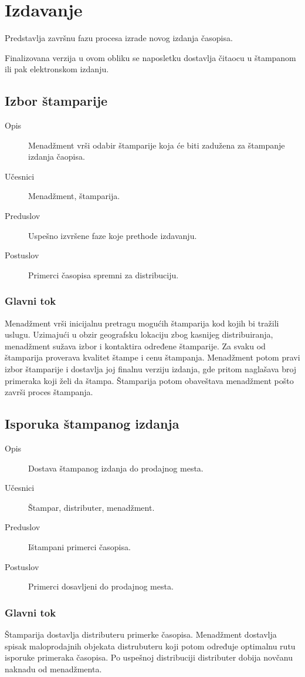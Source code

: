\section{Izdavanje}
Predstavlja završnu fazu procesa izrade novog izdanja časopisa.

Finalizovana verzija u ovom obliku se naposletku dostavlja čitaocu u štampanom ili pak elektronskom izdanju.

\subsection{Izbor štamparije}
\begin{description}
\item [Opis] Menadžment vrši odabir štamparije koja će biti zadužena za štampanje izdanja čaopisa.
\item [Učesnici] Menadžment, štamparija.
\item [Preduslov] Uspešno izvršene faze koje prethode izdavanju.
\item [Postuslov] Primerci časopisa spremni za distribuciju.
\end{description}
\subsubsection{Glavni tok}
Menadžment vrši inicijalnu pretragu mogućih štamparija kod kojih bi tražili uslugu. Uzimajući u obzir geografsku lokaciju zbog kasnijeg distribuiranja, menadžment sužava izbor i kontaktira određene štamparije.
Za svaku od štamparija proverava kvalitet štampe i cenu štampanja. Menadžment potom pravi izbor štamparije i dostavlja joj finalnu verziju izdanja, gde pritom naglašava broj primeraka koji želi da štampa.
Štamparija potom obaveštava menadžment pošto završi proces štampanja.

\subsection{Isporuka štampanog izdanja}
\begin{description}
\item [Opis] Dostava štampanog izdanja do prodajnog mesta.
\item [Učesnici] Štampar, distributer, menadžment.
\item [Preduslov] Ištampani primerci časopisa.
\item [Postuslov] Primerci dosavljeni do prodajnog mesta.
\end{description}
\subsubsection{Glavni tok}
Štamparija dostavlja distributeru primerke časopisa. Menadžment dostavlja spisak maloprodajnih objekata distrubuteru koji potom određuje optimalnu rutu isporuke primeraka časopisa. Po uspešnoj distribuciji distributer dobija novčanu naknadu od menadžmenta.

